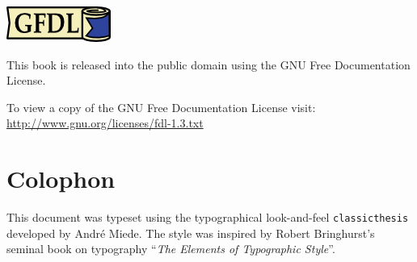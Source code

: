 \pagestyle{empty}

\hfill

\vfill


\includegraphics[scale=.5]{FrontBackmatter/gfdl-logo-small.png}

This book is released into the public domain using the GNU Free Documentation License. 
	
To view a copy of the GNU Free Documentation License visit: \\\url{http://www.gnu.org/licenses/fdl-1.3.txt}
\section*{Colophon}
This document was typeset using the typographical look-and-feel \texttt{classicthesis} developed by Andr\'e Miede. 
The style was inspired by Robert Bringhurst's seminal book on typography ``\emph{The Elements of Typographic Style}''.